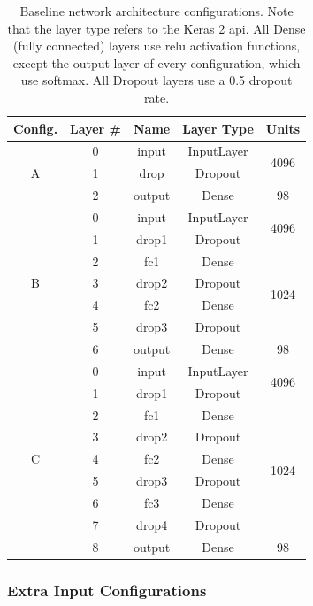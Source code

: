 \begin{table}[h!]
\begin{center}
\begin{tabular}{|c|c|c|c|c|}
\hline
\textbf{Config.} & \textbf{Layer \#} & \textbf{Name} & \textbf{Layer Type} & \textbf{Units} \\ \hline
\multirow{3}{*}{A} & 0 & input & InputLayer & \multirow{2}{*}{4096} \\ \cline{2-4}
 & 1 & drop & Dropout & \\ \cline{2-5}
 & 2 & output & Dense & 98 \\ \hline
\multirow{7}{*}{B} & 0 & input & InputLayer & \multirow{2}{*}{4096} \\ \cline{2-4}
 & 1 & drop1 & Dropout & \\ \cline{2-5}
 & 2 & fc1 & Dense & \multirow{4}{*}{1024} \\ \cline{2-4}
 & 3 & drop2 & Dropout & \\ \cline{2-4}
 & 4 & fc2 & Dense & \\ \cline{2-4}
 & 5 & drop3 & Dropout & \\ \cline{2-5}
 & 6 & output & Dense & 98 \\ \hline
\multirow{9}{*}{C} & 0 & input & InputLayer & \multirow{2}{*}{4096} \\ \cline{2-4}
 & 1 & drop1 & Dropout & \\ \cline{2-5}
 & 2 & fc1 & Dense & \multirow{6}{*}{1024} \\ \cline{2-4}
 & 3 & drop2 & Dropout & \\ \cline{2-4}
 & 4 & fc2 & Dense & \\ \cline{2-4}
 & 5 & drop3 & Dropout & \\ \cline{2-4}
 & 6 & fc3 & Dense & \\ \cline{2-4}
 & 7 & drop4 & Dropout & \\ \cline{2-5}
 & 8 & output & Dense & 98 \\ \hline
\end{tabular}
\end{center}
\caption[Baseline architecture configurations]{Baseline network architecture configurations. Note that the layer type refers to the Keras 2 \acrshort{api}. All Dense (fully connected) layers use \acrshort{relu} activation functions, except the output layer of every configuration, which use softmax. All Dropout layers use a 0.5 dropout rate.}
\label{tab:base-arch}
\end{table}

\subsubsection{Extra Input Configurations}

